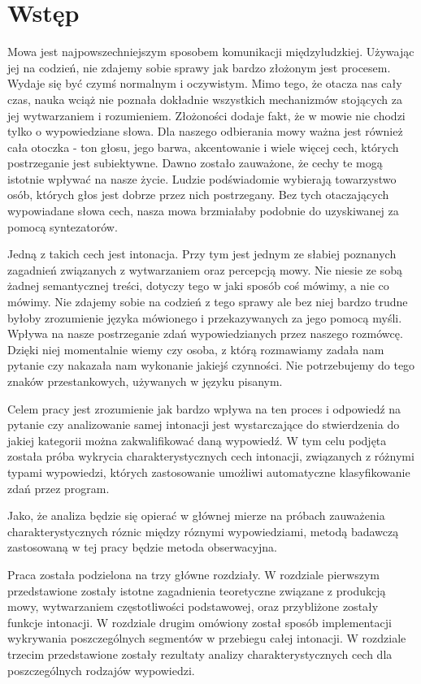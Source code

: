 \documentclass[a4paper,12 pt]{report}
\begin{document}
\section*{Wstęp}
Mowa jest najpowszechniejszym sposobem komunikacji międzyludzkiej. Używając jej na codzień, nie zdajemy sobie sprawy jak bardzo złożonym jest procesem. Wydaje się być czymś normalnym i oczywistym. Mimo tego, że otacza nas cały czas, nauka wciąż nie poznała dokładnie wszystkich mechanizmów stojących za jej wytwarzaniem i rozumieniem. Złożoności dodaje fakt, że w mowie nie chodzi tylko o wypowiedziane słowa. Dla naszego odbierania mowy ważna jest również cała otoczka - ton głosu, jego barwa, akcentowanie i wiele więcej cech, których postrzeganie jest subiektywne. Dawno zostało zauważone, że cechy te mogą istotnie wpływać na nasze życie. Ludzie podświadomie wybierają towarzystwo osób, których głos jest dobrze przez nich postrzegany. Bez tych otaczających wypowiadane słowa cech, nasza mowa brzmiałaby podobnie do uzyskiwanej za pomocą syntezatorów.

Jedną z takich cech jest intonacja. Przy tym jest jednym ze słabiej poznanych zagadnień związanych z wytwarzaniem oraz percepcją mowy. Nie niesie ze sobą żadnej semantycznej treści, dotyczy tego w jaki sposób coś mówimy, a nie co mówimy. Nie zdajemy sobie na codzień z tego sprawy ale bez niej bardzo trudne byłoby zrozumienie języka mówionego i przekazywanych za jego pomocą myśli. Wpływa na nasze postrzeganie zdań wypowiedzianych przez naszego rozmówcę. Dzięki niej momentalnie wiemy czy osoba, z którą rozmawiamy zadała nam pytanie czy nakazała nam wykonanie jakiejś czynności. Nie potrzebujemy do tego znaków przestankowych, używanych w języku pisanym.

Celem pracy jest zrozumienie jak bardzo wpływa na ten proces i odpowiedź na pytanie czy analizowanie samej intonacji jest wystarczające do stwierdzenia do jakiej kategorii można zakwalifikować daną wypowiedź. W tym celu podjęta została próba wykrycia charakterystycznych cech intonacji, związanych z różnymi typami wypowiedzi, których zastosowanie umożliwi automatyczne klasyfikowanie zdań przez program.

Jako, że analiza będzie się opierać w głównej mierze na próbach zauważenia charakterystycznych róznic między róznymi wypowiedziami, metodą badawczą zastosowaną w tej pracy będzie metoda obserwacyjna.

Praca została podzielona na trzy główne rozdziały.
W rozdziale pierwszym przedstawione zostały istotne zagadnienia teoretyczne związane z produkcją mowy, wytwarzaniem częstotliwości podstawowej,
oraz przybliżone zostały funkcje intonacji. W rozdziale drugim omówiony został sposób implementacji wykrywania poszczególnych segmentów w przebiegu całej intonacji. W rozdziale trzecim przedstawione zostały rezultaty analizy charakterystycznych cech dla poszczególnych rodzajów wypowiedzi.
\newpage
\end{document}
